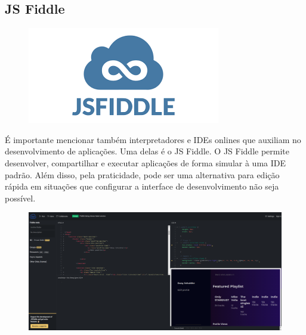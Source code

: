 	
	\subsection{JS Fiddle}
	\begin{figure}[H]
		\centering
		\includegraphics[width=0.2\linewidth]{Pictures/JS_Fiddle}
		\caption{}
		\label{fig:jsfiddle}
	\end{figure}
	É importante mencionar também interpretadores e IDEs onlines que auxiliam no desenvolvimento de aplicações. Uma delas é o JS Fiddle. O JS Fiddle permite desenvolver, compartilhar e executar aplicações de forma simular à uma IDE padrão. Além disso, pela praticidade, pode ser uma alternativa para edição rápida em situações que configurar a interface de desenvolvimento não seja possível.

\begin{figure}[H]
	\centering
	\includegraphics[width=0.9\linewidth]{Pictures/JS_Fiddle_Image}
	\caption{}
	\label{fig:jsfiddleimage}
\end{figure}



   